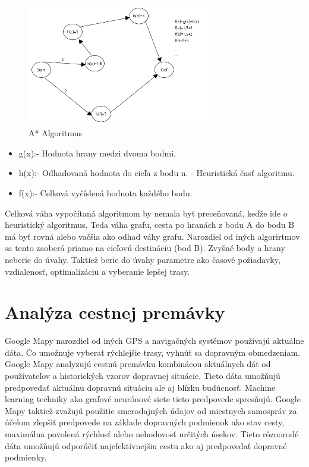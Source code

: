 \documentclass[10pt,twoside,slovak,a4paper]{article}
\begin{document}
\begin{figure}
  \centering
  \includegraphics[width=8cm]{a-star}
  \caption{A* Algoritmus}
\end{figure}
	\begin{itemize}
	\item g(x):- Hodnota hrany medzi dvoma bodmi.
	\item h(x):- Odhadovaná hodnota do cieľa z bodu n. - Heuristická časť algoritmu.
	\item f(x):- Celková vyčíslená hodnota každého bodu.
	\end{itemize}

Celková váha vypočítaná algoritmom by nemala byť preceňovaná, keďže ide o heuristický algoritmus. Teda váha grafu, cesta po hranách z bodu A do bodu B má byť rovná alebo vačšia ako odhad váhy grafu. Narozdiel od iných algorirtmov sa tento zaoberá priamo na cieľovú destináciu (bod B). Zvyšné body a hrany neberie do úvahy. Taktiež berie do úvahy parametre ako časové požiadavky, vzdialenosť, optimalizáciu a vyberanie lepšej trasy. 




\section{Analýza cestnej premávky} 
Google Mapy narozdiel od iných GPS a navigačných systémov používajú aktuálne dáta. Čo umožnuje vyberať rýchlejšie trasy, vyhnúť sa dopravným obmedzeniam. 
Google Mapy analyzujú cestnú premávku kombinácou aktuálnych dát od používateľov a historických vzorov dopravnej situácie. Tieto dáta umožňujú predpovedať aktuálnu dopravnú situáciu ale aj blízku budúcnosť. Machine learning techniky ako grafové neurónové siete tieto predpovede spresňujú. Google Mapy taktiež zvažujú použitie smerodajných údajov od miestnych samospráv za účelom zlepšiť predpovede na základe dopravných podmienok ako stav cesty, maximálna povolená rýchlosť alebo nehodovosť určitých úsekov. Tieto rôznorodé dáta umožňujú odporúčiť najefektívnejšiu cestu ako aj predpovedať dopravné podmienky.
\end{document}
